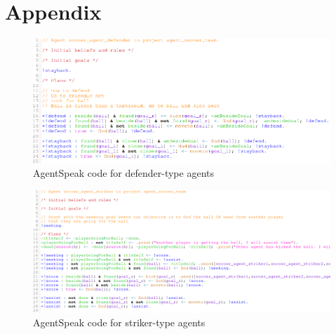 \documentclass[conference]{IEEEtran}
\begin{document}
\section{Appendix}
\centering
\begin{figure}[h]
	\centering
	\includegraphics[width=\textwidth]{fig/defender-code.png}
	\caption{AgentSpeak code for defender-type agents}
	\label{code-defender}
\end{figure}

\begin{figure}[h]
	\centering
	\includegraphics[width=\textwidth]{fig/striker-code.png}
	\caption{AgentSpeak code for striker-type agents}
	\label{code-striker}
\end{figure}
\end{document}
